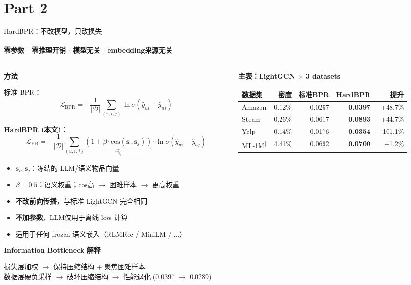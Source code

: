 \documentclass[11pt,aspectratio=169]{beamer}
\begin{document}
\section{Part 2}
\begin{frame}{HardBPR：不改模型，只改损失}
\framesubtitle{零参数 $\cdot$ 零推理开销 $\cdot$ 模型无关 $\cdot$ embedding来源无关}

\begin{columns}[T]
\begin{column}{0.52\textwidth}
\textbf{方法}

\vspace{2mm}
\small
标准 BPR：
$$\mathcal{L}_{\text{BPR}} = -\frac{1}{|\mathcal{D}|}\sum_{(u,i,j)}\ln\sigma(\hat{y}_{ui}-\hat{y}_{uj})$$

\vspace{1mm}
\textbf{HardBPR (本文)}：
$$\mathcal{L}_{\text{HB}} = -\frac{1}{|\mathcal{D}|}\sum_{(u,i,j)} \!\!\!\underbrace{(1 + \beta\!\cdot\!\text{cos}(\mathbf{s}_i,\mathbf{s}_j))}_{w_{ij}}\!\!\! \cdot \ln\sigma(\hat{y}_{ui}-\hat{y}_{uj})$$

\vspace{2mm}
\begin{itemize}
\setlength\itemsep{3pt}
\item $\mathbf{s}_i$, $\mathbf{s}_j$：冻结的 LLM/语义物品向量
\item $\beta=0.5$：语义权重；$\text{cos}$高 $\to$ 困难样本 $\to$ 更高权重
\item \textbf{不改前向传播}，与标准 LightGCN 完全相同
\item \textbf{不加参数}，LLM仅用于离线 loss 计算
\item 适用于任何 frozen 语义嵌入（RLMRec / MiniLM / ...）
\end{itemize}

\vspace{2mm}
\textbf{Information Bottleneck 解释}

\scriptsize
损失层加权 $\to$ 保持压缩结构 + 聚焦困难样本 \\
数据层硬负采样 $\to$ 破坏压缩结构 $\to$ 性能退化 (0.0397 $\to$ 0.0289)
\end{column}

\begin{column}{0.48\textwidth}
\textbf{主表：LightGCN $\times$ 3 datasets}

\vspace{2mm}
\footnotesize
\begin{tabular}{lrrrr}
\toprule
数据集 & 密度 & 标准BPR & HardBPR & 提升 \\
\midrule
Amazon & 0.12\% & 0.0267 & \textbf{0.0397} & +48.7\% \\
Steam & 0.26\% & 0.0617 & \textbf{0.0893} & +44.7\% \\
Yelp & 0.14\% & 0.0176 & \textbf{0.0354} & +101.1\% \\
\midrule
ML-1M\textsuperscript{$\dagger$} & 4.41\% & 0.0692 & \textbf{0.0700} & +1.2\% \\
\bottomrule
\end{tabular}
\vspace{1mm}


\end{column}
\end{columns}
\end{frame}
\end{document}
